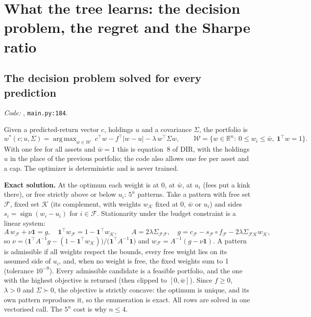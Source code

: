\documentclass[11pt,a4paper]{article}
\DeclareMathOperator*{\argmax}{arg\,max}
\newcommand{\R}{\mathbb{R}}
\newcommand{\1}{\mathbf{1}}
\newcommand{\W}{\mathcal{W}}
\newcommand{\Fr}{\mathcal{F}}
\newcommand{\Kx}{\mathcal{K}}
\newcommand{\code}[1]{\texttt{\detokenize{#1}}}
\begin{document}
\section{What the tree learns: the decision problem, the regret and the Sharpe ratio}\label{sec:learn}

\subsection{The decision problem solved for every prediction}\label{sec:decision}
{\small\emph{Code:} \code{PortfolioOptimizer.solve}, \texttt{main.py:184}.}

Given a predicted-return vector $c$, holdings $u$ and a covariance $\Sigma$, the portfolio is
\begin{equation}
w^\ast(c;u,\Sigma)=\argmax_{w\in\W}\; c^\top w-f^\top|w-u|-\lambda\,w^\top\Sigma w,
\qquad \W=\{w\in\R^n:\ 0\le w_i\le\bar w,\ \1^\top w=1\}.
\label{eq:decision}
\end{equation}
With one fee for all assets and $\bar w=1$ this is equation~8 of DIR, with the holdings $u$ in the place of the previous portfolio; the code also allows one fee per asset and a cap. The optimizer is deterministic and is never trained.

\textbf{Exact solution.} At the optimum each weight is at $0$, at $\bar w$, at $u_i$ (fees put a kink there), or free strictly above or below $u_i$: $5^n$ patterns. Take a pattern with free set $\Fr$, fixed set $\Kx$ (its complement, with weights $w_\Kx$ fixed at $0$, $\bar w$ or $u_i$) and sides $s_i=\operatorname{sign}(w_i-u_i)$ for $i\in\Fr$. Stationarity under the budget constraint is a linear system:
\begin{equation}
A\,w_\Fr+\nu\1=g,\quad \1^\top w_\Fr=1-\1^\top w_\Kx,\qquad
A=2\lambda\Sigma_{\Fr\Fr},\quad g=c_\Fr-s_\Fr\circ f_\Fr-2\lambda\Sigma_{\Fr\Kx}w_\Kx,
\end{equation}
so $\nu=\big(\1^\top A^{-1}g-(1-\1^\top w_\Kx)\big)/\big(\1^\top A^{-1}\1\big)$ and $w_\Fr=A^{-1}(g-\nu\1)$. A pattern is admissible if all weights respect the bounds, every free weight lies on its assumed side of $u_i$, and, when no weight is free, the fixed weights sum to 1 (tolerance $10^{-9}$). Every admissible candidate is a feasible portfolio, and the one with the highest objective is returned (then clipped to $[0,\bar w]$). Since $f\ge0$, $\lambda>0$ and $\Sigma\succ 0$, the objective is strictly concave: the optimum is unique, and its own pattern reproduces it, so the enumeration is exact. All rows are solved in one vectorised call. The $5^n$ cost is why $n\le 4$.
\end{document}
